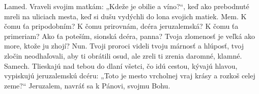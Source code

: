 Lamed.
Vraveli svojim matkám:
„Kdeže je obilie a víno?“,
keď ako prebodnuté mreli
na uliciach mesta,
keď si dušu vydýchli
do lona svojich matiek.
\versseparator
Mem.
K čomu ťa pripodobním? K čomu prirovnám,
dcéra jeruzalemská?
K čomu ťa primeriam? Ako ťa poteším,
sionská dcéra, panna?
Tvoja zlomenosť je veľká ako more,
ktože ju zhojí?
\versseparator
Nun.
Tvoji proroci videli tvoju
márnosť a hlúposť,
tvoj zločin neodhaľovali,
aby ti obrátili osud,
ale zreli ti zrenia
daromné, klamné.
\versseparator
Samech.
Tlieskajú nad tebou do dlaní
všetci, čo idú cestou,
kývajú hlavou, vypiskujú
jeruzalemskú dcéru:
„Toto je mesto vrcholnej vraj krásy
a rozkoš celej zeme?“
\versseparator
Jeruzalem, navráť sa k Pánovi, svojmu Bohu.